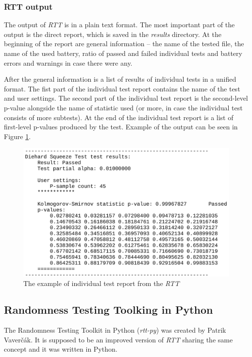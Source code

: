 \documentclass[
  digital,     %
  oneside,     %
  nosansbold,  %
  nocolorbold, %
  nolof,         %
  nolot,         %
]{fithesis4}
\begin{document}
\subsubsection{RTT output}
The output of \emph{RTT} is in a plain text format. The most important part of the output is the direct report, which is saved in the \emph{results} directory. At the beginning of the report are general information -- the name of the tested file, the name of the used battery, ratio of passed and failed individual tests and battery errors and warnings in case there were any.

After the general information is a list of results of individual tests in a unified format. The fist part of the individual test report contains the name of the test and user settings. The second part of the individual test report is the second-level p-value alongside the name of statistic used (or more, in case the individual test consists of more subtests). At the end of the individual test report is a list of first-level p-values produced by the test. Example of the output can be seen in Figure \ref{fig:rtt_output_example}.

\begin{figure}
  \begin{center}
    \includegraphics[width=12cm]{figures/rtt_dieharder_output.jpg}
  \end{center}
  \caption{The example of individual test report from the \emph{RTT}}
  \label{fig:rtt_output_example}
\end{figure}


\subsection{Randomness Testing Toolking in Python} \label{chap:sols-rtt-py}
The Randomness Testing Toolkit in Python (\emph{rtt-py}) was created by Patrik Vaverčák. It is supposed to be an improved version of \emph{RTT} sharing the same concept \cite[p.~24]{vavercak} and it was written in Python.
\end{document}
